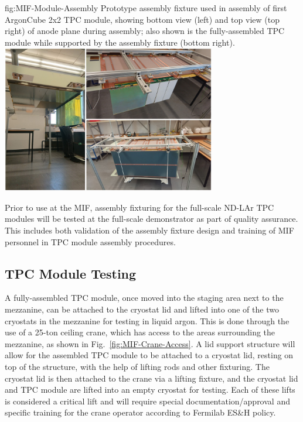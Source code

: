\begin{dunefigure}{fig:MIF-Module-Assembly}
{Prototype assembly fixture used in assembly of first ArgonCube 2x2 TPC module, showing bottom view (left) and top view (top right) of anode plane during assembly; also shown is the fully-assembled TPC module while supported by the assembly fixture (bottom right).}
\includegraphics[width=0.7\textwidth]{graphics/lartpc/Construction/MIF-Module-Assembly.png}
\end{dunefigure}

Prior to use at the MIF, assembly fixturing for the full-scale ND-LAr TPC modules will be tested at the full-scale demonstrator as part of quality assurance.  This includes both validation of the assembly fixture design and training of MIF personnel in TPC module assembly procedures.

\subsection{TPC Module Testing}

A fully-assembled TPC module, once moved into the staging area next to the mezzanine, can be attached to the cryostat lid and lifted into one of the two cryostats in the mezzanine for testing in liquid argon.  This is done through the use of a 25-ton ceiling crane, which has access to the areas surrounding the mezzanine, as shown in Fig.~\ref{fig:MIF-Crane-Access}.  A lid support structure will allow for the assembled TPC module to be attached to a cryostat lid, resting on top of the structure, with the help of lifting rods and other fixturing.  The cryostat lid is then attached to the crane via a lifting fixture, and the cryostat lid and TPC module are lifted into an empty cryostat for testing.  Each of these lifts is considered a critical lift and will require special documentation/approval and specific training for the crane operator according to Fermilab ES\&H policy.


